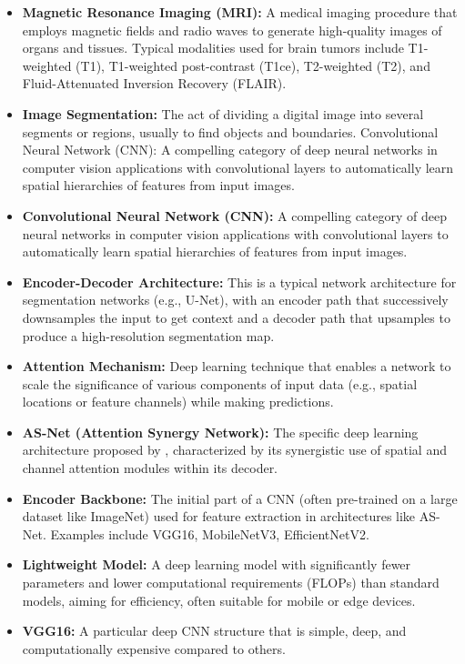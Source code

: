 \begin{itemize}
  \item \textbf{Magnetic Resonance Imaging (MRI):} A medical imaging procedure that employs magnetic fields and radio waves to generate high-quality images of organs and tissues. Typical modalities used for brain tumors include T1-weighted (T1), T1-weighted post-contrast (T1ce), T2-weighted (T2), and Fluid-Attenuated Inversion Recovery (FLAIR).
  \item \textbf{Image Segmentation:} The act of dividing a digital image into several segments or regions, usually to find objects and boundaries.
    Convolutional Neural Network (CNN): A compelling category of deep neural networks in computer vision applications with convolutional layers to automatically learn spatial hierarchies of features from input images.
  \item \textbf{Convolutional Neural Network (CNN):} A compelling category of deep neural networks in computer vision applications with convolutional layers to automatically learn spatial hierarchies of features from input images.
  \item \textbf{Encoder-Decoder Architecture:} This is a typical network architecture for segmentation networks (e.g., U-Net), with an encoder path that successively downsamples the input to get context and a decoder path that upsamples to produce a high-resolution segmentation map.
  \item \textbf{Attention Mechanism:} Deep learning technique that enables a network to scale the significance of various components of input data (e.g., spatial locations or feature channels) while making predictions.
  \item \textbf{AS-Net (Attention Synergy Network):} The specific deep learning architecture proposed by \textcite{hu2022asnet}, characterized by its synergistic use of spatial and channel attention modules within its decoder.
  \item \textbf{Encoder Backbone:} The initial part of a CNN (often pre-trained on a large dataset like ImageNet) used for feature extraction in architectures like AS-Net. Examples include VGG16, MobileNetV3, EfficientNetV2.
  \item \textbf{Lightweight Model:} A deep learning model with significantly fewer parameters and lower computational requirements (FLOPs) than standard models, aiming for efficiency, often suitable for mobile or edge devices.
  \item \textbf{VGG16:} A particular deep CNN structure that is simple, deep, and computationally expensive compared to others.

\end{itemize}

